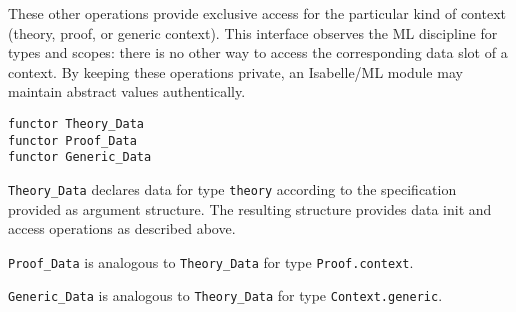 \begin{isabellebody}
\begin{isamarkuptext}
  These other operations provide exclusive access for the particular
  kind of context (theory, proof, or generic context).  This interface
  observes the ML discipline for types and scopes: there is no other
  way to access the corresponding data slot of a context.  By keeping
  these operations private, an Isabelle/ML module may maintain
  abstract values authentically.%
\end{isamarkuptext}%
\isamarkuptrue%
%
\isadelimmlref
%
\endisadelimmlref
%
\isatagmlref
%
\begin{isamarkuptext}%
\begin{mldecls}
  \verb|functor Theory_Data| \\
  \verb|functor Proof_Data| \\
  \verb|functor Generic_Data| \\
  \end{mldecls}

  \begin{description}

  \item \verb|Theory_Data| declares data for
  type \verb|theory| according to the specification provided as
  argument structure.  The resulting structure provides data init and
  access operations as described above.

  \item \verb|Proof_Data| is analogous to
  \verb|Theory_Data| for type \verb|Proof.context|.

  \item \verb|Generic_Data| is analogous to
  \verb|Theory_Data| for type \verb|Context.generic|.


\end{description}
\end{isamarkuptext}
\end{isabellebody}
